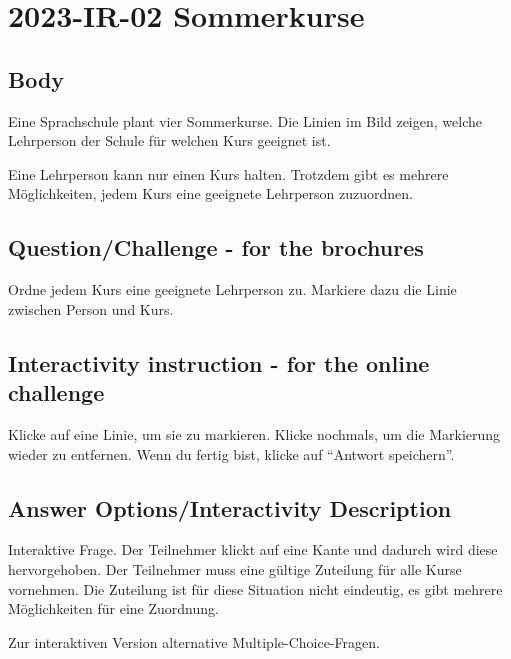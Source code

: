 \documentclass[a4paper,11pt]{report}
\newcommand{\taskGraphicsFolder}{..}
\begin{document}
\section*{\centering{} 2023-IR-02 Sommerkurse}


\subsection*{Body}

Eine Sprachschule plant vier Sommerkurse.
Die Linien im Bild zeigen, welche Lehrperson der Schule für welchen Kurs geeignet ist.

{\centering%
\par}

Eine Lehrperson kann nur einen Kurs halten.
Trotzdem gibt es mehrere Möglichkeiten, jedem Kurs eine geeignete Lehrperson zuzuordnen.

{\em


\subsection*{Question/Challenge - for the brochures}

Ordne jedem Kurs eine geeignete Lehrperson zu.
Markiere dazu die Linie zwischen Person und Kurs.

}


\subsection*{Interactivity instruction - for the online challenge}

Klicke auf eine Linie, um sie zu markieren. Klicke nochmals, um die Markierung wieder zu entfernen. Wenn du fertig bist, klicke auf \enquote{Antwort speichern}.

\begingroup
\renewcommand{\arraystretch}{1.5}
\subsection*{Answer Options/Interactivity Description}

Interaktive Frage. Der Teilnehmer klickt auf eine Kante und dadurch wird diese hervorgehoben. Der Teilnehmer muss eine gültige Zuteilung für alle Kurse vornehmen. Die Zuteilung ist für diese Situation nicht eindeutig, es gibt mehrere Möglichkeiten für eine Zuordnung.

Zur interaktiven Version alternative Multiple-Choice-Fragen.
\end{document}
